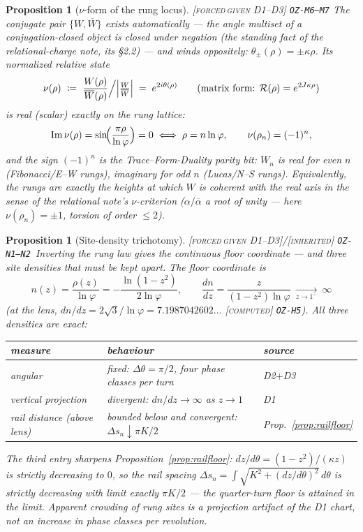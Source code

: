 \documentclass[11pt]{article}
\newcommand{\tagFD}{\textcolor{cF}{\textsc{[forced}}\,\textcolor{cD}{\textsc{given D1--D3]}}}
\newcommand{\tagC}{\textcolor{cC}{\textsc{[computed]}}}
\newcommand{\tagI}{\textcolor{cI}{\textsc{[inherited]}}}
\newcommand{\hx}[1]{\textcolor{cC}{\footnotesize\texttt{#1}}}
\newcommand{\gp}{\varphi}
\theoremstyle{plain}
\newtheorem{proposition}[theorem]{Proposition}
\theoremstyle{definition}
\theoremstyle{remark}
\begin{document}
\begin{proposition}[$\nu$-form of the rung locus]\label{prop:nulocus}\tagFD{} \hx{OZ-M6--M7}
The conjugate pair $\{W,\overline W\}$ exists automatically --- the angle
multiset of a conjugation-closed object is closed under negation (the standing
fact of the relational-charge note, its \S2.2) --- and winds oppositely:
$\theta_\pm(\rho)=\pm\kappa\rho$. Its normalized relative state
\[
\nu(\rho)\ \coloneqq\ \frac{W(\rho)}{\overline{W}(\rho)}\Big/\Bigl|\tfrac{W}{\overline W}\Bigr|
\;=\;e^{2i\theta(\rho)}
\qquad\text{(matrix form: } \mathcal R(\rho)=e^{2J\kappa\rho}\text{)}
\]
is real (scalar) exactly on the rung lattice:
\[
\operatorname{Im}\nu(\rho)=\sin\!\Bigl(\frac{\pi\rho}{\ln\gp}\Bigr)=0
\iff \rho=n\ln\gp,
\qquad
\nu(\rho_n)=(-1)^n ,
\]
and the sign $(-1)^n$ is the Trace--Form-Duality parity bit: $W_n$ is real for
even $n$ (Fibonacci/E--W rungs), imaginary for odd $n$ (Lucas/N--S rungs).
Equivalently, the rungs are exactly the heights at which $W$ is coherent with
the real axis in the sense of the relational note's $\nu$-criterion
($\alpha/\overline\alpha$ a root of unity --- here $\nu(\rho_n)=\pm1$, torsion
of order $\le2$).
\end{proposition}


\begin{proposition}[Site-density trichotomy]\label{prop:trichotomy}\tagFD{}/\tagI{}
\hx{OZ-N1--N2}\ Inverting the rung law gives the continuous floor coordinate ---
and three site densities that must be kept apart. The floor coordinate is
\[
n(z)=\frac{\rho(z)}{\ln\gp}=-\frac{\ln(1-z^2)}{2\ln\gp},
\qquad
\frac{dn}{dz}=\frac{z}{(1-z^2)\ln\gp}\ \xrightarrow[z\to1^-]{}\ \infty
\]
(at the lens, $dn/dz=2\sqrt3/\ln\gp=7.1987042602\ldots$ \tagC{} \hx{OZ-H5}).
All three densities are exact:
\begin{center}\small
\begin{tabular}{@{}lll@{}}
\toprule
measure & behaviour & source\\
\midrule
angular & fixed: $\Delta\theta=\pi/2$, four phase classes per turn & D2$+$D3\\
vertical projection & divergent: $dn/dz\to\infty$ as $z\to1$ & D1\\
rail distance (above lens) & bounded below and convergent: $\Delta s_n\downarrow \pi K/2$ & Prop.~\ref{prop:railfloor}\\
\bottomrule
\end{tabular}
\end{center}
The third entry sharpens Proposition~\ref{prop:railfloor}:
$dz/d\theta=(1-z^2)/(\kappa z)$ is strictly decreasing to $0$, so the rail
spacing $\Delta s_n=\int\sqrt{K^2+(dz/d\theta)^2}\,d\theta$ is strictly
decreasing with limit \emph{exactly} $\pi K/2$ --- the quarter-turn floor is
attained in the limit. Apparent crowding of rung sites is a projection
artifact of the D1 chart, not an increase in phase classes per revolution.
\end{proposition}
\end{document}

